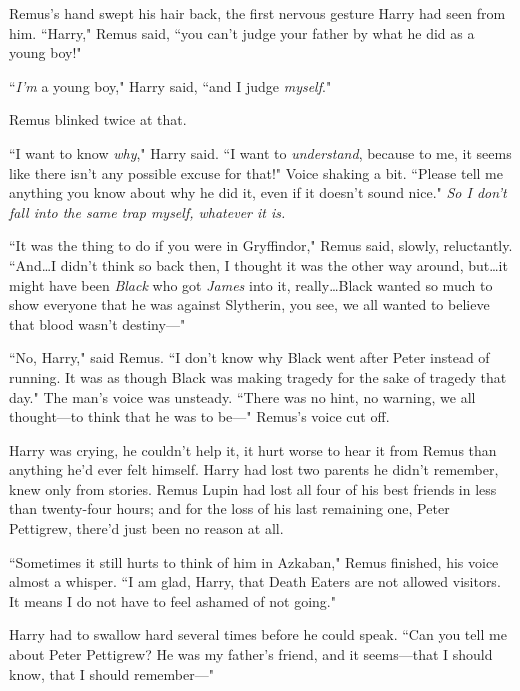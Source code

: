 Remus's hand swept his hair back, the first nervous gesture Harry had seen from him. ``Harry," Remus said, ``you can't judge your father by what he did as a young boy!"

``\emph{I'm} a young boy," Harry said, ``and I judge \emph{myself}."

Remus blinked twice at that.

``I want to know \emph{why}," Harry said. ``I want to \emph{understand}, because to me, it seems like there isn't any possible excuse for that!" Voice shaking a bit. ``Please tell me anything you know about why he did it, even if it doesn't sound nice." \emph{So I don't fall into the same trap myself, whatever it is.}

``It was the thing to do if you were in Gryffindor," Remus said, slowly, reluctantly. ``And…I didn't think so back then, I thought it was the other way around, but…it might have been \emph{Black} who got \emph{James} into it, really…Black wanted so much to show everyone that he was against Slytherin, you see, we all wanted to believe that blood wasn't destiny—"

\later

``No, Harry," said Remus. ``I don't know why Black went after Peter instead of running. It was as though Black was making tragedy for the sake of tragedy that day." The man's voice was unsteady. ``There was no hint, no warning, we all thought—to think that he was to be—" Remus's voice cut off.

Harry was crying, he couldn't help it, it hurt worse to hear it from Remus than anything he'd ever felt himself. Harry had lost two parents he didn't remember, knew only from stories. Remus Lupin had lost all four of his best friends in less than twenty-four hours; and for the loss of his last remaining one, Peter Pettigrew, there'd just been no reason at all.

``Sometimes it still hurts to think of him in Azkaban," Remus finished, his voice almost a whisper. ``I am glad, Harry, that Death Eaters are not allowed visitors. It means I do not have to feel ashamed of not going."

Harry had to swallow hard several times before he could speak. ``Can you tell me about Peter Pettigrew? He was my father's friend, and it seems—that I should know, that I should remember—"

